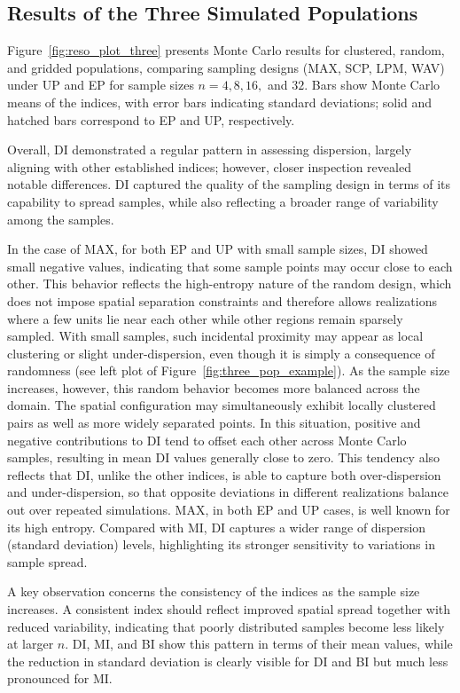 \documentclass[12pt]{imsart}
\theoremstyle{plain}
\theoremstyle{remark}
\begin{document}
\subsection{Results of the Three Simulated Populations}

Figure~\ref{fig:reso_plot_three} presents Monte Carlo results for clustered, random, and gridded populations, comparing sampling designs (MAX, SCP, LPM, WAV) under UP and EP for sample sizes $n=4,8,16,$ and $32$. Bars show Monte Carlo means of the indices, with error bars indicating standard deviations; solid and hatched bars correspond to EP and UP, respectively.

Overall, DI demonstrated a regular pattern in assessing dispersion, largely aligning with other established indices; however, closer inspection revealed notable differences. DI captured the quality of the sampling design in terms of its capability to spread samples, while also reflecting a broader range of variability among the samples.

In the case of MAX, for both EP and UP with small sample sizes, DI showed small negative values, indicating that some sample points may occur close to each other. This behavior reflects the high-entropy nature of the random design, which does not impose spatial separation constraints and therefore allows realizations where a few units lie near each other while other regions remain sparsely sampled. With small samples, such incidental proximity may appear as local clustering or slight under-dispersion, even though it is simply a consequence of randomness (see left plot of Figure~\ref{fig:three_pop_example}). As the sample size increases, however, this random behavior becomes more balanced across the domain. The spatial configuration may simultaneously exhibit locally clustered pairs as well as more widely separated points. In this situation, positive and negative contributions to DI tend to offset each other across
Monte Carlo samples, resulting in mean DI values generally close to zero. This tendency also reflects that DI, unlike the other indices, is able to capture both over-dispersion and under-dispersion, so that opposite deviations in different realizations balance out over repeated simulations. MAX, in both EP and UP cases, is well known for its high entropy. Compared with MI, DI captures a wider range of dispersion (standard deviation) levels, highlighting its stronger sensitivity to variations in sample spread.

A key observation concerns the consistency of the indices as the sample size increases. A consistent index should reflect improved spatial spread together with reduced variability, indicating that poorly distributed samples become less likely at larger \(n\). DI, MI, and BI show this pattern in terms of their mean values, while the reduction in standard deviation is clearly visible for DI and BI but much less pronounced for MI.
\end{document}
